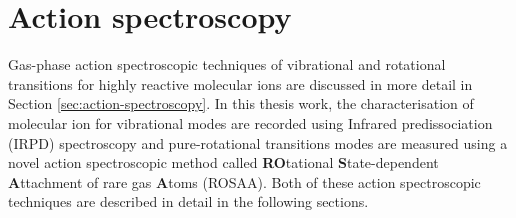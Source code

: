 \section{Action spectroscopy}

Gas-phase action spectroscopic techniques of vibrational and rotational transitions for highly reactive molecular ions are discussed in more detail in Section \ref{sec:action-spectroscopy}. In this thesis work, the characterisation of molecular ion for vibrational modes are recorded using Infrared predissociation (IRPD) spectroscopy and pure-rotational transitions modes are measured using a novel action spectroscopic method called \textbf{RO}tational \textbf{S}tate-dependent \textbf{A}ttachment of rare gas \textbf{A}toms (ROSAA). Both of these action spectroscopic techniques are described in detail in the following sections.
